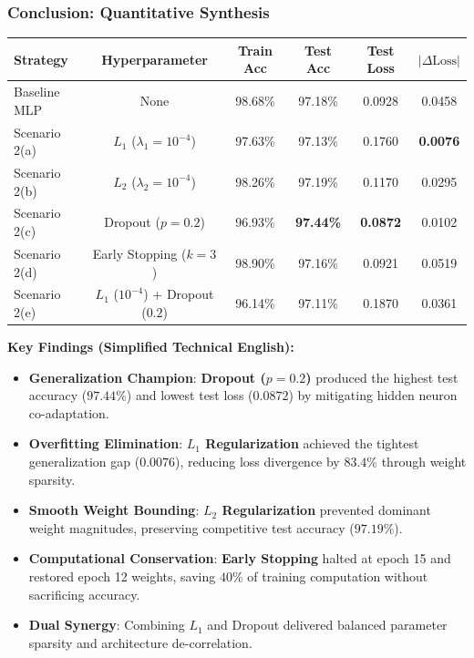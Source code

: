 {
\usebackgroundtemplate{\backgroundcontent}
\begin{frame}
    \frametitle{Conclusion: Quantitative Synthesis}
    \vspace{-0.20cm}
    \begin{table}[h]
        \centering\scriptsize
        \renewcommand{\arraystretch}{0.92}
        \setlength{\tabcolsep}{4pt}
        \begin{tabular}{lccccc}
            \toprule
            \textbf{Strategy} & \textbf{Hyperparameter} & \textbf{Train Acc} & \textbf{Test Acc} & \textbf{Test Loss} & \textbf{$|\Delta \text{Loss}|$} \\
            \midrule
            Baseline MLP & None & 98.68\% & 97.18\% & 0.0928 & 0.0458 \\
            Scenario 2(a) & $L_1$ ($\lambda_1 = 10^{-4}$) & 97.63\% & 97.13\% & 0.1760 & \textbf{0.0076} \\
            Scenario 2(b) & $L_2$ ($\lambda_2 = 10^{-4}$) & 98.26\% & 97.19\% & 0.1170 & 0.0295 \\
            Scenario 2(c) & Dropout ($p = 0.2$) & 96.93\% & \textbf{97.44\%} & \textbf{0.0872} & 0.0102 \\
            Scenario 2(d) & Early Stopping ($k=3$) & 98.90\% & 97.16\% & 0.0921 & 0.0519 \\
            Scenario 2(e) & $L_1$ ($10^{-4}$) + Dropout ($0.2$) & 96.14\% & 97.11\% & 0.1870 & 0.0361 \\
            \bottomrule
        \end{tabular}
    \end{table}

    \vspace{-0.15cm}
    \textbf{\scriptsize Key Findings (Simplified Technical English):}
    \vspace{0.02cm}
    \begin{itemize}\scriptsize
        \setlength\itemsep{1pt}
        \item \textbf{Generalization Champion}: \textbf{Dropout ($p=0.2$)} produced the highest test accuracy ($97.44\%$) and lowest test loss ($0.0872$) by mitigating hidden neuron co-adaptation.
        \item \textbf{Overfitting Elimination}: \textbf{$L_1$ Regularization} achieved the tightest generalization gap ($0.0076$), reducing loss divergence by $83.4\%$ through weight sparsity.
        \item \textbf{Smooth Weight Bounding}: \textbf{$L_2$ Regularization} prevented dominant weight magnitudes, preserving competitive test accuracy ($97.19\%$).
        \item \textbf{Computational Conservation}: \textbf{Early Stopping} halted at epoch 15 and restored epoch 12 weights, saving $40\%$ of training computation without sacrificing accuracy.
        \item \textbf{Dual Synergy}: Combining $L_1$ and Dropout delivered balanced parameter sparsity and architecture de-correlation.
    \end{itemize}
\end{frame}
}


